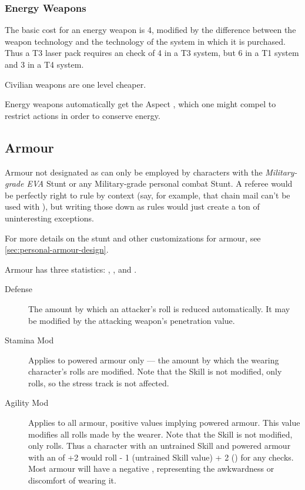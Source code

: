 \subsubsection{Energy Weapons}
\label{sec:personal-combat-energy-weapons}

% 

The basic cost for an energy weapon is 4, modified by the difference between the weapon technology and the technology of the system in which it is purchased. Thus a T3 laser pack requires an  check of 4 in a T3 system, but 6 in a T1 system and 3 in a T4 system.

Civilian weapons are one level cheaper.

Energy weapons automatically get the Aspect , which one might compel to restrict actions in order to conserve energy.

\subsection{Armour}\label{sec:personal-combat-armour}

Armour not designated as  can only be employed by characters with the \emph{Military-grade EVA} Stunt or any Military-grade personal combat Stunt. A referee would be perfectly right to rule by context (say, for example, that chain mail can't be used with ), but writing those down as rules would just create a ton of uninteresting exceptions.

For more details on the  stunt and other customizations for armour, see \autoref{sec:personal-armour-design}.


Armour has three statistics: , , and .

\begin{description}
\item [Defense]
The amount by which an attacker's roll is reduced automatically. It may be modified by the attacking weapon's penetration value.
\item [Stamina Mod]
Applies to powered armour only --- the amount by which the wearing character's  rolls are modified. Note that the  Skill is not modified, only rolls, so the \Health{} stress track is not affected.
\item [Agility Mod]
Applies to all armour, positive values implying powered armour. This value modifies all  rolls made by the wearer. Note that the  Skill is not modified, only rolls. Thus a character with an untrained  Skill and powered armour with an  of +2 would roll \dF{} - 1 (untrained Skill value) + 2 () for any  checks. Most armour will have a negative , representing the awkwardness or discomfort of wearing it.
\end{description}

